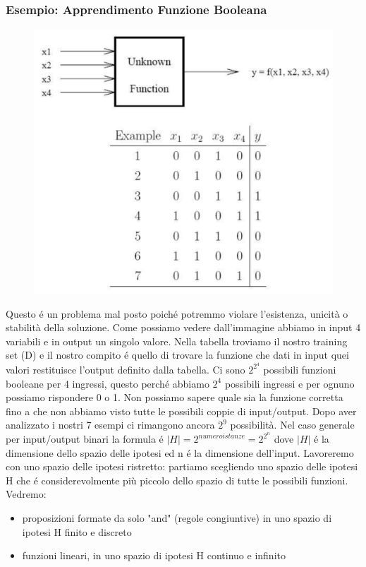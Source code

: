 \documentclass{article}
\begin{document}
\subsubsection{Esempio: Apprendimento Funzione Booleana}
\begin{figure}[H]
    \centering
    \includegraphics[scale=0.4]{Images/esempiofunzionebooleana.png}
\end{figure}
Questo é un problema mal posto poiché potremmo violare l'esistenza, unicità o stabilità della soluzione. Come possiamo vedere dall'immagine abbiamo in input 4 variabili e in output un singolo valore. Nella tabella troviamo il nostro training set (D) e il nostro compito é quello di trovare la funzione che dati in input quei valori restituisce l'output definito dalla tabella. Ci sono $2^{2^4}$ possibili funzioni booleane per 4 ingressi, questo perché abbiamo $2^4$ possibili ingressi e per ognuno possiamo rispondere 0 o 1. Non possiamo sapere quale sia la funzione corretta fino a che non abbiamo visto tutte le possibili coppie di input/output. Dopo aver analizzato i nostri 7 esempi ci rimangono ancora $2^9$ possibilità. Nel caso generale per input/output binari la formula é $|H| = 2^{numeroistanze} = 2^{2^n}$ dove $|H|$ é la dimensione dello spazio delle ipotesi ed n é la dimensione dell'input. \newline
Lavoreremo con uno spazio delle ipotesi ristretto: partiamo scegliendo uno spazio delle ipotesi H che é considerevolmente più piccolo dello spazio di tutte le possibili funzioni. \newline Vedremo: 
\begin{itemize}
    \item proposizioni formate da solo "and" (regole congiuntive) in uno spazio di ipotesi H finito e discreto
    \item funzioni lineari, in uno spazio di ipotesi H continuo e infinito
\end{itemize}
\end{document}
